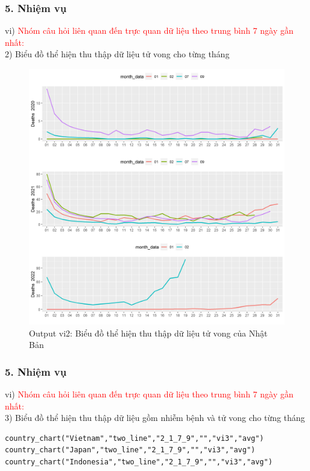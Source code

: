 \documentclass[english,10pt,table]{beamer}
\begin{document}
\begin{frame}[fragile]
\frametitle{5.  Nhiệm vụ}
vi) \textcolor{red}{Nhóm câu hỏi liên quan đến trực quan dữ liệu theo trung bình 7 ngày gần nhất:}\\
    2) Biểu đồ thể hiện thu thập dữ liệu tử vong cho từng tháng
	\begin{figure}[h!]
	\begin{center}
		    \includegraphics[scale = 0.26]{Images/VI/vi2 Japan .jpeg}
		     \caption{Output vi2: Biểu đồ thể hiện thu thập dữ liệu tử vong của Nhật Bản}
		\end{center}
		\end{figure}
\end{frame}

\begin{frame}[fragile]
\frametitle{5.  Nhiệm vụ}
vi) \textcolor{red}{Nhóm câu hỏi liên quan đến trực quan dữ liệu theo trung bình 7 ngày gần nhất:}\\
    3) Biểu đồ thể hiện thu thập dữ liệu gồm nhiễm bệnh và tử vong cho từng tháng
    \begin{lstlisting}[frame=single,basicstyle=\tiny]  
country_chart("Vietnam","two_line","2_1_7_9","","vi3","avg")
country_chart("Japan","two_line","2_1_7_9","","vi3","avg")
country_chart("Indonesia","two_line","2_1_7_9","","vi3","avg")
		\end{lstlisting}
\end{frame}
\end{document}
